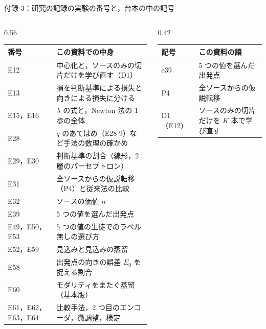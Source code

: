 \begin{frame}{付録 3：研究の記録の実験の番号と，台本の中の記号}
  \label{a:codes}
  \vspace{-0.2em}
  \begin{columns}[T,onlytextwidth]
    \begin{column}{0.56\textwidth}
      \centering\tiny
      \renewcommand{\arraystretch}{1.08}
      \begin{tabularx}{\linewidth}{@{}l X@{}}
        \toprule
        番号 & この資料での中身 \\
        \midrule
        E12 & 中心化と，ソースのみの切片だけを学び直す（D1） \\
        E13 & 損を判断基準による損失と向きによる損失に分ける \\
        E15，E16 & $\lambda$ の式と，Newton 法の 1 歩の全体 \\
        E28 & $q$ のあてはめ（E28-9）など手法の数理の確かめ \\
        E29，E30 & 判断基準の割合（線形，2 層のパーセプトロン） \\
        E31 & 全ソースからの仮説転移（P4）と従来法の比較 \\
        E32 & ソースの価値 $n$ \\
        E39 & 5 つの値を選んだ出発点 \\
        E49，E50，E53 & 5 つの値の生徒でのラベル無しの選び方 \\
        E52，E59 & 見込みと見込みの蒸留 \\
        E58 & 出発点の向きの誤差 $E_0$ を捉える割合 \\
        E60 & モダリティをまたぐ蒸留（基本版） \\
        E61，E62，E63，E64 & 比較手法，2 つ目のエンコーダ，微調整，検定 \\
        \bottomrule
      \end{tabularx}
    \end{column}
    \begin{column}{0.42\textwidth}
      \centering\tiny
      \renewcommand{\arraystretch}{1.08}
      \begin{tabularx}{\linewidth}{@{}l X@{}}
        \toprule
        記号 & この資料の語 \\
        \midrule
        e39 & 5 つの値を選んだ出発点 \\
        P4 & 全ソースからの仮説転移 \\
        D1（E12） & ソースのみの切片だけを $K$ 本で学び直す \\

\end{tabularx}
\end{column}
\end{columns}
\end{frame}
